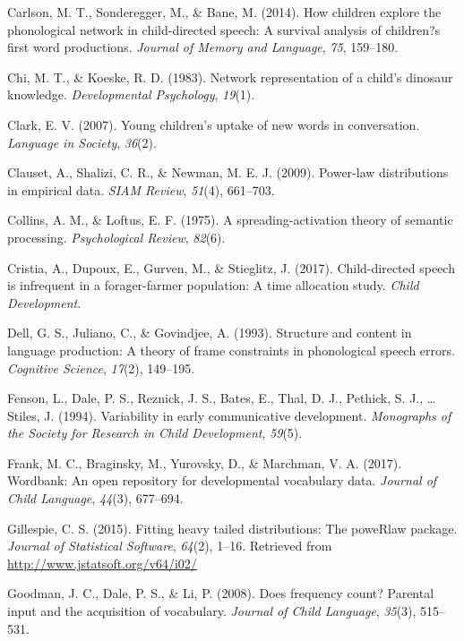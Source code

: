 \documentclass[english,floatsintext,man]{apa6}
\theoremstyle{definition}
\theoremstyle{definition}
\theoremstyle{definition}
\theoremstyle{remark}
\begin{document}
\hypertarget{ref-carlson2014}{}
Carlson, M. T., Sonderegger, M., \& Bane, M. (2014). How children
explore the phonological network in child-directed speech: A survival
analysis of children?s first word productions. \emph{Journal of Memory
and Language}, \emph{75}, 159--180.

\hypertarget{ref-chi1983}{}
Chi, M. T., \& Koeske, R. D. (1983). Network representation of a child's
dinosaur knowledge. \emph{Developmental Psychology}, \emph{19}(1).

\hypertarget{ref-clark2007}{}
Clark, E. V. (2007). Young children's uptake of new words in
conversation. \emph{Language in Society}, \emph{36}(2).

\hypertarget{ref-clauset09}{}
Clauset, A., Shalizi, C. R., \& Newman, M. E. J. (2009). Power-law
distributions in empirical data. \emph{SIAM Review}, \emph{51}(4),
661--703.

\hypertarget{ref-collins1975}{}
Collins, A. M., \& Loftus, E. F. (1975). A spreading-activation theory
of semantic processing. \emph{Psychological Review}, \emph{82}(6).

\hypertarget{ref-cristia2017}{}
Cristia, A., Dupoux, E., Gurven, M., \& Stieglitz, J. (2017).
Child-directed speech is infrequent in a forager-farmer population: A
time allocation study. \emph{Child Development}.

\hypertarget{ref-dell1993}{}
Dell, G. S., Juliano, C., \& Govindjee, A. (1993). Structure and content
in language production: A theory of frame constraints in phonological
speech errors. \emph{Cognitive Science}, \emph{17}(2), 149--195.

\hypertarget{ref-fenson94}{}
Fenson, L., Dale, P. S., Reznick, J. S., Bates, E., Thal, D. J.,
Pethick, S. J., \ldots{} Stiles, J. (1994). Variability in early
communicative development. \emph{Monographs of the Society for Research
in Child Development}, \emph{59}(5).

\hypertarget{ref-frank2017}{}
Frank, M. C., Braginsky, M., Yurovsky, D., \& Marchman, V. A. (2017).
Wordbank: An open repository for developmental vocabulary data.
\emph{Journal of Child Language}, \emph{44}(3), 677--694.

\hypertarget{ref-gillespie15}{}
Gillespie, C. S. (2015). Fitting heavy tailed distributions: The
poweRlaw package. \emph{Journal of Statistical Software}, \emph{64}(2),
1--16. Retrieved from \url{http://www.jstatsoft.org/v64/i02/}

\hypertarget{ref-goodman2008}{}
Goodman, J. C., Dale, P. S., \& Li, P. (2008). Does frequency count?
Parental input and the acquisition of vocabulary. \emph{Journal of Child
Language}, \emph{35}(3), 515--531.
\end{document}
